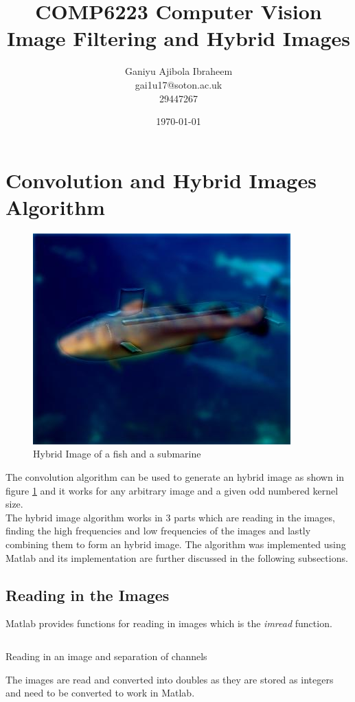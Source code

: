 \documentclass[a4paper,12pt]{article}
\begin{document}
	
\begin{titlepage}
	\title{
		COMP6223 Computer Vision \\
		\large Image Filtering and Hybrid Images
	}
	\date{\today}
	\author{
		Ganiyu Ajibola Ibraheem \\
		\large gai1u17@soton.ac.uk \\
			29447267
	}
\end{titlepage}

\maketitle
\newpage
{}
\tableofcontents
\newpage
\listoffigures
\listoftables
\listoflistings
\newpage
{}


\section{Convolution and Hybrid Images Algorithm}
\begin{figure}[h!]
	\centering
	\includegraphics[width=0.35\linewidth]{images/fish_submarine}
	\caption{Hybrid Image of a fish and a submarine}
	\label{fig:fish_submarine}
\end{figure}
The convolution algorithm can be used to generate an hybrid image as shown in figure \ref{fig:fish_submarine} and it works for any arbitrary image and a given odd numbered kernel size. \\

The hybrid image algorithm works in 3 parts which are reading in the images, finding the high frequencies and low frequencies of the images and lastly combining them to form an hybrid image. The algorithm was implemented using Matlab and its implementation are further discussed in the following subsections.

	\subsection{Reading in the Images}
	Matlab provides functions for reading in images which is the \textit{imread} function. 
	\begin{listing}[htbp!]
		\inputminted[breaklines=true,breakautoindent=true,firstline=9,lastline=14]{matlab}{minty_matlab.m}
		\caption{Reading in an image and separation of channels}
		\label{code:algebraic} 
	\end{listing}
	The images are read and converted into doubles as they are stored as integers and need to be converted to work in Matlab.
	
\end{document}

